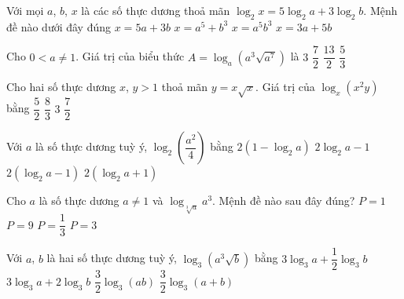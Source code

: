 \begin{ex}%
	Với mọi $a$, $b$, $x$ là các số thực dương thoả mãn $\log_{2}x=5\log_{2}a+3\log_{2}b$. Mệnh đề nào dưới đây đúng
	\choice
	{$x=5a+3b$}
	{$x=a^5+b^3$}
	{\True $x=a^5b^3$}
	{$x=3a+5b$}
\end{ex}



\begin{ex}%
	Cho $0<a\ne 1$. Giá trị của biểu thức $A=\log_{a}{\left(a^3\sqrt{a^7}\right)}$ là
	\choice
	{$3$}
	{$\dfrac{7}{2}$}
	{\True $\dfrac{13}{2}$}
	{$\dfrac{5}{3}$}
\end{ex}



\begin{ex}%
	Cho hai số thực dương $x$, $y>1$ thoả mãn $y=x\sqrt{x}$. Giá trị của $\log_{x}{(x^2y)}$ bằng
	\choice
	{$\dfrac{5}{2}$}
	{$\dfrac{8}{3}$}
	{$3$}
	{\True $\dfrac{7}{2}$}
\end{ex}



\begin{ex}%
	Với $a$ là số thực dương tuỳ ý, $\log_{2}{\left(\dfrac{a^2}{4}\right)}$ bằng
	\choice
	{$2(1-\log_{2}a)$}
	{$2\log_{2}a-1$}
	{\True $2(\log_{2}a-1)$}
	{$2(\log_{2}a+1)$}
\end{ex}



\begin{ex}%
	Cho $a$ là số thực dương $a \ne 1$ và $\log_{\sqrt[3]{a}}{a^3}$. Mệnh đề nào sau đây đúng?
	\choice
	{$P=1$}
	{\True $P=9$}
	{$P=\dfrac{1}{3}$}
	{$P=3$}
\end{ex}



\begin{ex}%
	Với $a$, $b$ là hai số thực dương tuỳ ý, $\log_{3}{(a^3\sqrt{b})}$ bằng
	\choice
	{\True $3\log_{3}a+\dfrac{1}{2}\log_{3}b$}
	{$3\log_{3}a+2\log_{3}b$}
	{$\dfrac{3}{2}\log_{3}{(ab)}$}
	{$\dfrac{3}{2}\log_{3}{(a+b)}$}
\end{ex}


